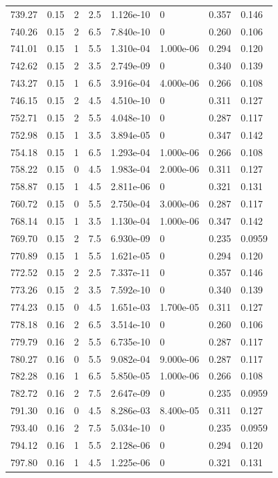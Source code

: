 \documentclass[preview]{standalone}
\begin{document}
{{{{{{{{\begin{tabular}{L{1.2cm}C{1.2cm} C{0.3cm}C{0.5cm} C{1.4cm}C{1.4cm} C{1.4cm}C{1.4cm}}
  739.27  &  0.15  & 2     & 2.5 &  1.126e-10  & 0  & 0.357 &  0.146   \\ 
  740.26  &  0.15  & 2     & 6.5 &  7.840e-10  & 0  & 0.260 &  0.106   \\ 
  741.01  &  0.15  & 1     & 5.5 &  1.310e-04  & 1.000e-06  & 0.294 &  0.120   \\ 
  742.62  &  0.15  & 2     & 3.5 &  2.749e-09  & 0  & 0.340 &  0.139   \\ 
  743.27  &  0.15  & 1     & 6.5 &  3.916e-04  & 4.000e-06  & 0.266 &  0.108   \\ 
  746.15  &  0.15  & 2     & 4.5 &  4.510e-10  & 0  & 0.311 &  0.127   \\ 
  752.71  &  0.15  & 2     & 5.5 &  4.048e-10  & 0  & 0.287 &  0.117   \\ 
  752.98  &  0.15  & 1     & 3.5 &  3.894e-05  & 0  & 0.347 &  0.142   \\ 
  754.18  &  0.15  & 1     & 6.5 &  1.293e-04  & 1.000e-06  & 0.266 &  0.108   \\ 
  758.22  &  0.15  & 0     & 4.5 &  1.983e-04  & 2.000e-06  & 0.311 &  0.127   \\ 
  758.87  &  0.15  & 1     & 4.5 &  2.811e-06  & 0  & 0.321 &  0.131   \\ 
  760.72  &  0.15  & 0     & 5.5 &  2.750e-04  & 3.000e-06  & 0.287 &  0.117   \\ 
  768.14  &  0.15  & 1     & 3.5 &  1.130e-04  & 1.000e-06  & 0.347 &  0.142   \\ 
  769.70  &  0.15  & 2     & 7.5 &  6.930e-09  & 0  & 0.235 &  0.0959   \\ 
  770.89  &  0.15  & 1     & 5.5 &  1.621e-05  & 0  & 0.294 &  0.120   \\ 
  772.52  &  0.15  & 2     & 2.5 &  7.337e-11  & 0  & 0.357 &  0.146   \\ 
  773.26  &  0.15  & 2     & 3.5 &  7.592e-10  & 0  & 0.340 &  0.139   \\ 
  774.23  &  0.15  & 0     & 4.5 &  1.651e-03  & 1.700e-05  & 0.311 &  0.127   \\ 
  778.18  &  0.16  & 2     & 6.5 &  3.514e-10  & 0  & 0.260 &  0.106   \\ 
  779.79  &  0.16  & 2     & 5.5 &  6.735e-10  & 0  & 0.287 &  0.117   \\ 
  780.27  &  0.16  & 0     & 5.5 &  9.082e-04  & 9.000e-06  & 0.287 &  0.117   \\ 
  782.28  &  0.16  & 1     & 6.5 &  5.850e-05  & 1.000e-06  & 0.266 &  0.108   \\ 
  782.72  &  0.16  & 2     & 7.5 &  2.647e-09  & 0  & 0.235 &  0.0959   \\ 
  791.30  &  0.16  & 0     & 4.5 &  8.286e-03  & 8.400e-05  & 0.311 &  0.127   \\ 
  793.40  &  0.16  & 2     & 7.5 &  5.034e-10  & 0  & 0.235 &  0.0959   \\ 
  794.12  &  0.16  & 1     & 5.5 &  2.128e-06  & 0  & 0.294 &  0.120   \\ 
  797.80  &  0.16  & 1     & 4.5 &  1.225e-06  & 0  & 0.321 &  0.131   \\ 
\hline 
\end{tabular} 

}}}}}}}}
\end{document}
